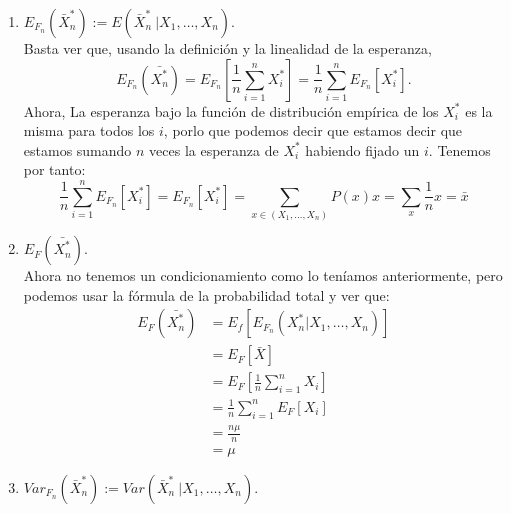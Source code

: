 \documentclass[a4paper]{article}
\begin{document}
   \begin{enumerate}

     \item \(E_{F_n}( \bar X_n^* ):= E(\bar X_n^* \ | X_1,\dots,X_n)\).\\

  Basta ver que, usando la definición y la linealidad de la esperanza,
  \[
  E_{F_n}\left( \bar{X^*_n}\right) = E_{F_n}\left[\frac{1}{n} \sum_{i=1}^n X_i^* \right] = \frac{1}{n} \sum_{i=1}^n E_{F_n} \left[X_i^*\right].
  \]
  Ahora, La esperanza bajo la función de distribución empírica de los \( X_i^*\) es la misma para todos los \(i\), porlo que podemos decir que estamos decir que estamos sumando \(n\) veces la esperanza de \(X_i^*\) habiendo fijado un \(i\). Tenemos por tanto:
  \[
  \frac{1}{n} \sum_{i=1}^n E_{F_n} \left[X_i^*\right] = E_{F_n}\left[X_i^*\right] = \sum_{x \in (X_1,\dots,X_n)} P(x) x  = \sum_x \frac{1}{n} x = \bar x
  \]

\item \(E_F(\bar{X_n^*})\).\\

  Ahora no tenemos un condicionamiento como lo teníamos anteriormente, pero podemos usar la fórmula de la probabilidad total y ver que:
  \begin{align*}
    E_F(\bar{X_n^*}) & = E_f \left[ E_{F_n}(X_n^*|X_1,\dots,X_n)\right] \\
    & = E_F[\bar X] \\
    & = E_F\left[ \frac{1}{n}\sum_{i=1}^n X_i\right] \\
    & = \frac{1}{n}\sum_{i=1}^n E_F[X_i]\\
    & = \frac{n\mu}{n} \\
    & = \mu
  \end{align*}



\item \(Var_{F_n}\left(\bar X_n^*\right) := Var(\bar X_n^* \ | X_1,\dots, X_n)\).\\


\end{enumerate}
\end{document}
